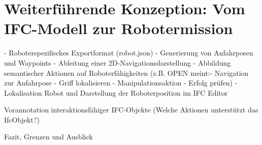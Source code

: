 
\section{Weiterführende Konzeption: Vom IFC-Modell zur Robotermission}\label{sec:Weiterführung}
- Roboterspezifisches Exportformat (robot.json)  \newline
- Generierung von Anfahrposen und Waypoints \newline
- Ableitung einer 2D-Navigationsdarstellung \newline
- Abbildung semantischer Aktionen auf Roboterfähigkeiten (z.B. OPEN meint:- Navigation zur Anfahrpose - Griff lokalisieren - Manipulationsaktion - Erfolg prüfen) \newline
- Lokalisation Robot und Darstellung der Roboterposition im IFC Editor \newline

Vorannotation interaktionsfähiger IFC-Objekte (Welche Aktionen unterstützt das IfcObjekt?) \newline



Fazit, Grenzen und Ausblick \newline